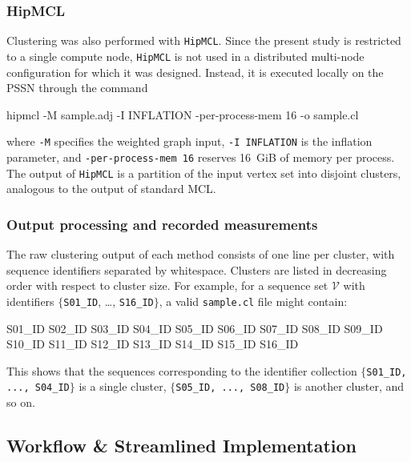 \subsubsection{HipMCL}

Clustering was also performed with \texttt{HipMCL}. Since the present study is
restricted to a single compute node, \texttt{HipMCL} is not used in a
distributed multi-node configuration for which it was designed. Instead, it
is executed locally on the PSSN through the command

\begin{plaintext}[numbers=none]
hipmcl -M sample.adj -I INFLATION -per-process-mem 16 -o sample.cl
\end{plaintext}

where \texttt{-M} specifies the weighted graph input, \texttt{-I INFLATION} is
the inflation parameter, and \texttt{-per-process-mem 16} reserves 16~GiB of
memory per process. The output of \texttt{HipMCL} is a partition of the input
vertex set into disjoint clusters, analogous to the output of standard MCL.

\subsubsection{Output processing and recorded measurements}

The raw clustering output of each method consists of one line per cluster, with
sequence identifiers separated by whitespace. Clusters are listed in decreasing
order with respect to cluster size. For example, for a sequence set
\(\mathscr{V}\) with identifiers \(\{\)\texttt{S01\_ID}, \dots,
\texttt{S16\_ID}\(\}\), a valid \texttt{sample.cl} file might contain:

\begin{plaintext}
S01_ID S02_ID S03_ID S04_ID
S05_ID S06_ID S07_ID S08_ID
S09_ID S10_ID S11_ID
S12_ID S13_ID
S14_ID S15_ID
S16_ID
\end{plaintext}

This shows that the sequences corresponding to the identifier collection
\(\{\)\texttt{S01\_ID, ..., S04\_ID}\(\}\) is a single cluster, \(\{\)\texttt{S05\_ID, ..., S08\_ID}\(\}\) is another cluster, and so on.

\subsection[Workflow \& \ Streamlined Implementation]{Workflow \& Streamlined Implementation}

